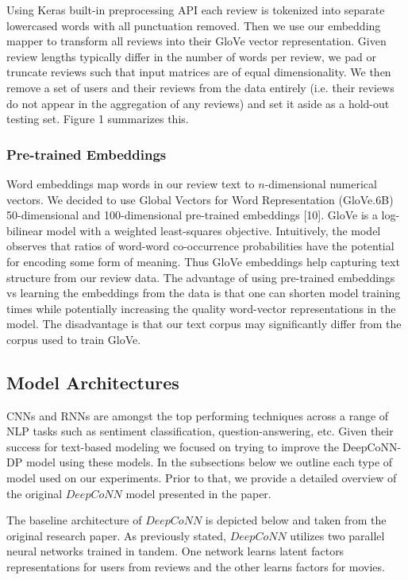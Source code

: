 \documentclass[10pt, twocolumn, letterpaper]{article}
\begin{document}
Using Keras built-in preprocessing API each review is tokenized into separate lowercased words with all punctuation removed. Then we use our embedding mapper to transform all reviews into their GloVe vector representation. Given review lengths typically differ in the number of words per review, we pad or truncate reviews such that input matrices are of equal dimensionality. We then remove a set of users and their reviews from the data entirely (i.e. their reviews do not appear in the aggregation of any reviews) and set it aside as a hold-out testing set. Figure 1 summarizes this.

\subsubsection{Pre-trained Embeddings}

Word embeddings map words in our review text to $n$-dimensional numerical vectors. We decided to use Global Vectors for Word Representation (GloVe.6B) 50-dimensional and 100-dimensional pre-trained embeddings [10]. GloVe is a log-bilinear model with a weighted least-squares objective. Intuitively, the model observes that ratios of word-word co-occurrence probabilities have the potential for encoding some form of meaning. Thus GloVe embeddings help capturing text structure from our review data. The advantage of using pre-trained embeddings vs learning the embeddings from the data is that one can shorten model training times while potentially increasing the quality word-vector representations in the model. The disadvantage is that our text corpus may significantly differ from the corpus used to train GloVe.

\subsection{Model Architectures}
CNNs and RNNs are amongst the top performing techniques across a range of NLP tasks such as sentiment classification, question-answering, etc. Given their success for text-based modeling we focused on trying to improve the DeepCoNN-DP model using these models. In the subsections below we outline each type of model used on our experiments. Prior to that, we provide a detailed overview of the original $DeepCoNN$ model presented in the paper.

The baseline architecture of $DeepCoNN$ is depicted below and taken from the original research paper. As previously stated, $DeepCoNN$ utilizes  two parallel neural networks trained in tandem. One network learns latent factors representations for users from reviews and the other learns factors for movies. \\
\end{document}

